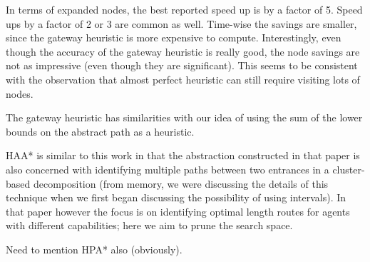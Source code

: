 In terms of expanded nodes, the best reported speed up is by a factor of 5.
Speed ups by a factor of 2 or 3 are common as well.
Time-wise the savings are smaller, since the gateway heuristic is more expensive to compute.
Interestingly, even though the accuracy of the gateway heuristic is really good,
the node savings are not as impressive (even though they are significant).
This seems to be consistent with the observation that almost perfect heuristic
can still require visiting lots of nodes.

The gateway heuristic has similarities with our idea of using the sum of the lower bounds on the abstract path as a heuristic.

\par
HAA* is similar to this work in that the abstraction constructed in that paper is also concerned with identifying multiple paths between two entrances in a cluster-based decomposition (from memory, we were discussing the details of this technique when we first began discussing the possibility of using intervals). In that paper however the focus is on identifying optimal length routes for agents with different capabilities; here we aim to prune the search space. 
\par 
Need to mention HPA* also (obviously).

